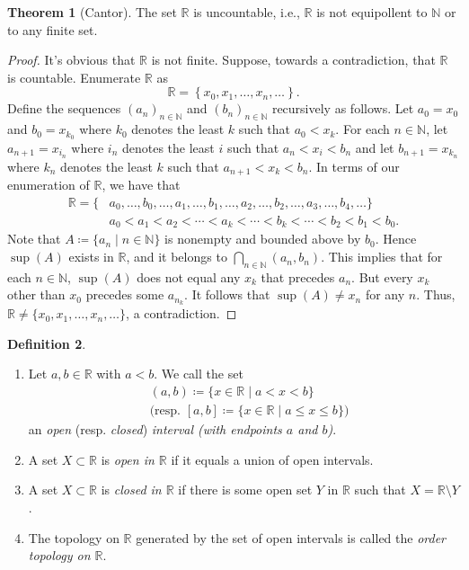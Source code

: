 \documentclass[10pt,letterpaper,cm]{nupset}
\theoremstyle{definition}
\newtheorem{definition}{Definition}[subsection]
\theoremstyle{theorem}
\newtheorem{theorem}[definition]{Theorem}
\theoremstyle{remark}
\newcommand{\N}{\mathbb N}
\newcommand{\R}{\mathbb R}
\newcommand{\1}{\mathbf{1}}
\newcommand{\0}{\vec 0}
\begin{document}
\begin{theorem}[Cantor]
The set $\R$ is uncountable, i.e., $\R$ is not equipollent to $\N$ or to any finite set.
\end{theorem}
\begin{proof}
It's obvious that $\R$ is not finite. Suppose, towards a contradiction, that $\R$ is countable. Enumerate $\R$ as $$\R = \left\{x_0, x_1, \ldots, x_n, \ldots\right\}.$$ Define the sequences $(a_n)_{n\in \N}$ and $(b_n)_{n\in \N}$ recursively as follows. Let $a_0 = x_0$ and $b_0 = x_{k_0}$ where $k_0$ denotes the least $k$ such that $a_0 < x_k$. For each $n\in \N$, let $a_{n+1}= x_{i_n}$ where $i_n$ denotes the least $i$ such that $a_n < x_i < b_n$ and let $b_{n+1} = x_{k_n}$ where $k_n$ denotes the least $k$ such that $a_{n+1} < x_k < b_n$. In terms of our enumeration of $\R$, we have that
\begin{align*}
  \R = \{& a_0, \ldots, b_0, \ldots, a_1, \ldots, b_1, \ldots, a_2, \ldots, b_2, \ldots, a_3, \ldots, b_4, \ldots\}
  \\ & a_0 < a_1 < a_2 < \cdots < a_k < \cdots < b_k < \cdots < b_2 < b_1 <b_0 .
\end{align*} 
Note that $A\coloneqq \{a_n \mid n\in \N\}$ is nonempty and bounded above by $b_0$. Hence $\sup(A)$ exists in $\R$, and it belongs to $\bigcap_{n\in \N} (a_n, b_n)$. This implies that for each $n\in \N$, $\sup(A)$ does not equal any $x_k$ that precedes $a_n$. But every $x_k$ other than $x_0$ precedes some $a_{n_k}$.
It follows that $\sup(A) \ne x_n$ for any $n$. Thus, $\R \ne \{x_0, x_1, \ldots, x_n, \ldots\}$, a contradiction.
\end{proof}

\begin{definition} $ $
\begin{enumerate}
\item Let $a, b \in \R$ with $a<b$. We call the set
\begin{align*}
& (a,b) \coloneqq \{x\in \R \mid a<x<b\}
\\ & \text{(resp. } [a,b]  \coloneqq \{x\in \R \mid a\leq x \leq b\}\text{)}
\end{align*} an  \textit{open} (resp. \textit{closed}) \textit{interval (with endpoints $a$ and $b$)}.
\item A set $X\subset \R$ is \textit{open in $\R$} if it equals a union of open intervals.
\item A set $X\subset \R$ is \textit{closed in $\R$} if there is some open set $Y$ in $\R$ such that $X= \R \setminus Y$. 
\item The topology on $\R$ generated by the set of open intervals is called the \textit{order topology on $\R$}. 
\end{enumerate}
\end{definition}
\end{document}
